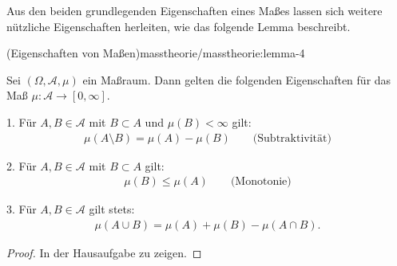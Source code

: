 \documentclass[letterpaper,10pt,english]{jupyterBook}
\begin{document}
\par
Aus den beiden grundlegenden Eigenschaften eines Maßes lassen sich weitere nützliche Eigenschaften herleiten, wie das folgende Lemma beschreibt.
\begin{lemma}{(Eigenschaften von Maßen)}{masstheorie/masstheorie:lemma-4}



\par
Sei \((\Omega, \mathcal{A}, \mu)\) ein Maßraum.
Dann gelten die folgenden Eigenschaften für das Maß \(\mu \colon \mathcal{A} \rightarrow [0,\infty]\).

\par
1. Für \(A,B \in \mathcal{A}\) mit \(B \subset A\) und \(\mu(B) < \infty\) gilt:
\begin{align*}
\mu(A \setminus B) = \mu(A) - \mu(B) \qquad \text{(Subtraktivität)}
\end{align*}
\par
2. Für \(A,B \in \mathcal{A}\) mit \(B \subset A\) gilt:
\begin{align*}
\mu(B) \leq \mu(A) \qquad \text{(Monotonie)}
\end{align*}
\par
3. Für \(A,B \in \mathcal{A}\) gilt stets:
\begin{align*}
\mu(A \cup B) = \mu(A) + \mu(B) - \mu(A \cap B).
\end{align*}\end{lemma}

\begin{proof}
 In der Hausaufgabe zu zeigen.
\end{proof}
\end{document}
